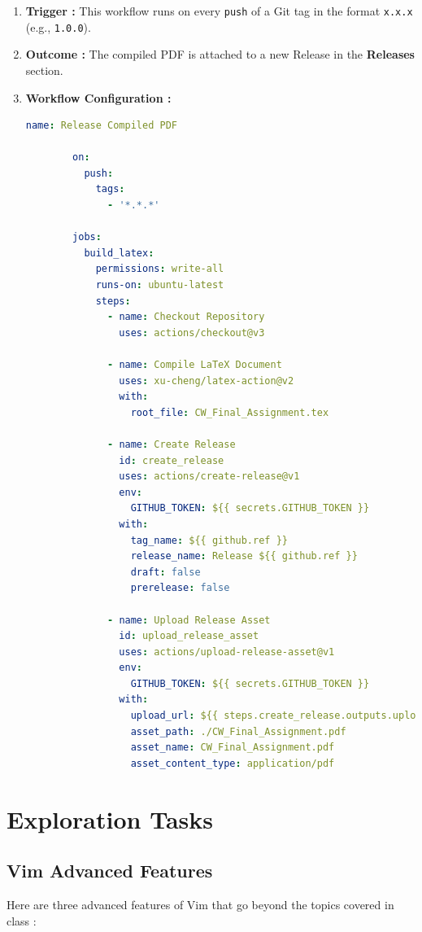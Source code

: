 \documentclass[12pt]{article}
\begin{document}
\begin{enumerate}
    \item \textbf{Trigger :} This workflow runs on every \texttt{push} of a Git tag in the format \texttt{x.x.x} (e.g., \texttt{1.0.0}).
    \item \textbf{Outcome :} The compiled PDF is attached to a new Release in the \textbf{Releases} section.
    \item \textbf{Workflow Configuration :}
    \begin{lstlisting}[language=yaml]
        name: Release Compiled PDF
        
        on:
          push:
            tags:
              - '*.*.*'
        
        jobs:
          build_latex:
            permissions: write-all
            runs-on: ubuntu-latest
            steps:
              - name: Checkout Repository
                uses: actions/checkout@v3
        
              - name: Compile LaTeX Document
                uses: xu-cheng/latex-action@v2
                with:
                  root_file: CW_Final_Assignment.tex
        
              - name: Create Release
                id: create_release
                uses: actions/create-release@v1
                env:
                  GITHUB_TOKEN: ${{ secrets.GITHUB_TOKEN }}
                with:
                  tag_name: ${{ github.ref }}
                  release_name: Release ${{ github.ref }}
                  draft: false
                  prerelease: false
        
              - name: Upload Release Asset
                id: upload_release_asset
                uses: actions/upload-release-asset@v1
                env:
                  GITHUB_TOKEN: ${{ secrets.GITHUB_TOKEN }}
                with:
                  upload_url: ${{ steps.create_release.outputs.upload_url }}
                  asset_path: ./CW_Final_Assignment.pdf
                  asset_name: CW_Final_Assignment.pdf
                  asset_content_type: application/pdf
    \end{lstlisting}
        
\end{enumerate}

\section{Exploration Tasks}
    \subsection{Vim Advanced Features}
    Here are three advanced features of Vim that go beyond the topics covered in class :
\end{document}
